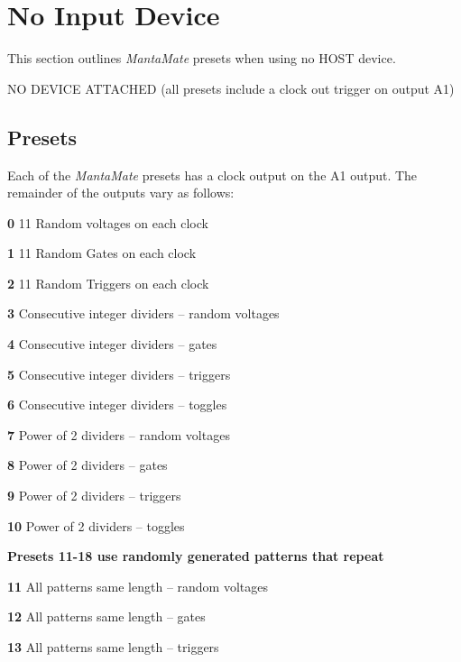 \renewcommand{\chaptername}{Section}
\chapter{No Input Device}

\begin{intro}
  This section outlines \emph{MantaMate} presets when using no HOST device.
\end{intro}

NO DEVICE ATTACHED
(all presets include a clock out trigger on output A1)

\section{Presets}

  Each of the \emph{MantaMate} presets has a clock output on the A1 output.
  The remainder of the outputs vary as follows:

  \textbf{0}
  11 Random voltages on each clock

  \textbf{1}
  11 Random Gates on each clock

  \textbf{2}
  11 Random Triggers on each clock

  \textbf{3}
  Consecutive integer dividers -- random voltages

  \textbf{4}
  Consecutive integer dividers -- gates

  \textbf{5}
  Consecutive integer dividers -- triggers

  \textbf{6}
  Consecutive integer dividers -- toggles

  \textbf{7}
  Power of 2 dividers -- random voltages

  \textbf{8}
  Power of 2 dividers -- gates

  \textbf{9}
  Power of 2 dividers -- triggers

  \textbf{10}
  Power of 2 dividers -- toggles

  \textbf{Presets 11-18 use randomly generated patterns that repeat}

  \textbf{11}
  All patterns same length -- random voltages

  \textbf{12}
  All patterns same length -- gates

  \textbf{13}
  All patterns same length -- triggers

